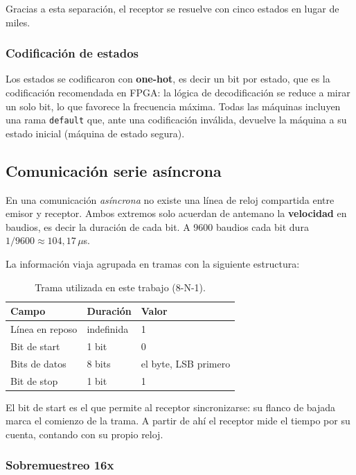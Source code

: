 \documentclass[12pt,a4paper]{article}
\begin{document}
Gracias a esta separación, el receptor se resuelve con cinco estados en lugar de
miles.

\subsubsection{Codificación de estados}

Los estados se codificaron con \textbf{one-hot}, es decir un bit por estado, que
es la codificación recomendada en FPGA: la lógica de decodificación se reduce a
mirar un solo bit, lo que favorece la frecuencia máxima. Todas las máquinas
incluyen una rama \texttt{default} que, ante una codificación inválida, devuelve
la máquina a su estado inicial (máquina de estado segura).

\subsection{Comunicación serie asíncrona}

En una comunicación \emph{asíncrona} no existe una línea de reloj compartida
entre emisor y receptor. Ambos extremos solo acuerdan de antemano la
\textbf{velocidad} en baudios, es decir la duración de cada bit. A 9600 baudios
cada bit dura $1/9600 \approx 104{,}17\,\mu$s.

La información viaja agrupada en tramas con la siguiente estructura:

\begin{table}[H]
  \centering
  \small
  \begin{tabular}{@{}lll@{}}
    \toprule
    \textbf{Campo} & \textbf{Duración} & \textbf{Valor} \\
    \midrule
    Línea en reposo & indefinida & 1 \\
    Bit de start    & 1 bit      & 0 \\
    Bits de datos   & 8 bits     & el byte, LSB primero \\
    Bit de stop     & 1 bit      & 1 \\
    \bottomrule
  \end{tabular}
  \caption{Trama utilizada en este trabajo (8-N-1).}
\end{table}

El bit de start es el que permite al receptor sincronizarse: su flanco de bajada
marca el comienzo de la trama. A partir de ahí el receptor mide el tiempo por su
cuenta, contando con su propio reloj.

\subsubsection{Sobremuestreo 16x}
\end{document}
